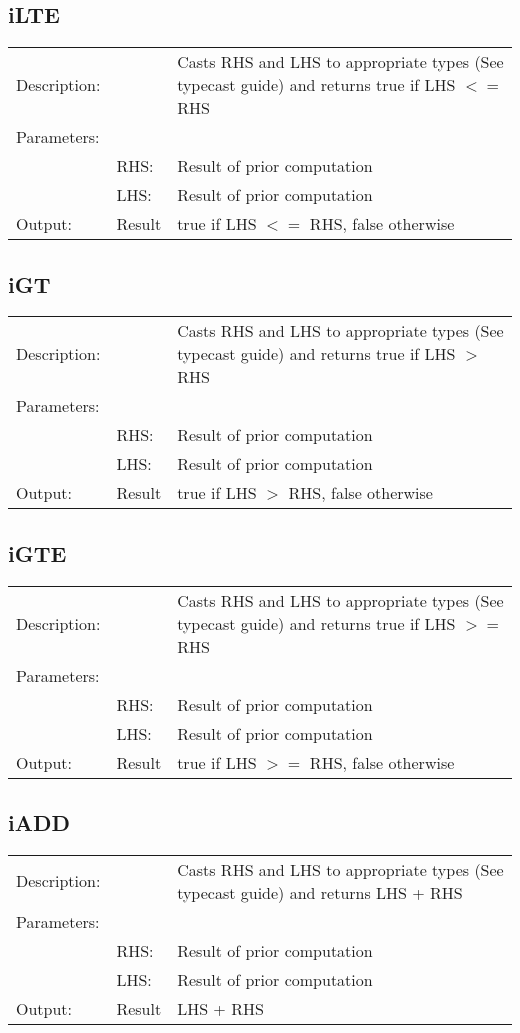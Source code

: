 \documentclass{report}
\begin{document}
\subsection{iLTE}
\begin{tabular}{l l p{10cm}}
Description: & ~    & Casts RHS and LHS to appropriate types (See typecast guide) and returns true if LHS $<=$ RHS\\
Parameters:  & ~ & ~ \\
~			 & RHS: & Result of prior computation\\
~			 & LHS: & Result of prior computation\\
Output:      & Result & true if LHS $<=$ RHS, false otherwise\\
\end{tabular}

\subsection{iGT}
\begin{tabular}{l l p{10cm}}
Description: & ~    & Casts RHS and LHS to appropriate types (See typecast guide) and returns true if LHS $>$ RHS\\
Parameters:  & ~ & ~ \\
~			 & RHS: & Result of prior computation\\
~			 & LHS: & Result of prior computation\\
Output:      & Result & true if LHS $>$ RHS, false otherwise\\
\end{tabular}

\subsection{iGTE}
\begin{tabular}{l l p{10cm}}
Description: & ~    & Casts RHS and LHS to appropriate types (See typecast guide) and returns true if LHS $>=$ RHS\\
Parameters:  & ~ & ~ \\
~			 & RHS: & Result of prior computation\\
~			 & LHS: & Result of prior computation\\
Output:      & Result & true if LHS $>=$ RHS, false otherwise\\
\end{tabular}

\subsection{iADD}
\begin{tabular}{l l p{10cm}}
Description: & ~    & Casts RHS and LHS to appropriate types (See typecast guide) and returns LHS + RHS\\
Parameters:  & ~ & ~ \\
~			 & RHS: & Result of prior computation\\
~			 & LHS: & Result of prior computation\\
Output:      & Result & LHS + RHS\\
\end{tabular}
\end{document}
